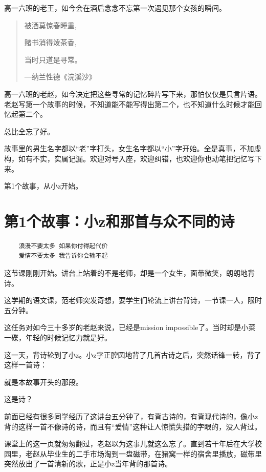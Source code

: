 \documentclass[openany]{ctexbook}
\begin{document}
高一六班的老王，如今会在酒后念念不忘第一次遇见那个女孩的瞬间。

\begin{quote}
被酒莫惊春睡重,

赌书消得泼茶香,

当时只道是寻常。

\begin{flushright}---纳兰性德《浣溪沙》\end{flushright}
\end{quote}

高一六班的老赵，如今决定把这些寻常的记忆碎片写下来，那怕仅仅是只言片语。
老赵写第一个故事的时候，不知道能不能写得出第二个，也不知道什么时候才能回忆起第二个。

总比全忘了好。

故事里的男生名字都以``老''字打头，女生名字都以``小''字开始。全是真事，不加虚构，如有不实，实属记漏。欢迎对号入座，欢迎纠错，也欢迎你也动笔把记忆写下来。

第1个故事，从小z开始。

\chapter*{第1个故事：小z和那首与众不同的诗}\label{z1}

\begin{verbatim}
    浪漫不要太多 如果你付得起代价 
    爱情不要太多 我告诉你会输不起
\end{verbatim}

这节课刚刚开始。讲台上站着的不是老师，却是一个女生，面带微笑，朗朗地背诗。

这学期的语文课，范老师突发奇想，要学生们轮流上讲台背诗，一节课一人，限时五分钟。

这任务对如今三十多岁的老赵来说，已经是mission
impossible了。当时却是小菜一碟，年轻的时候记忆力就是好。

这一天，背诗轮到了小z。小z字正腔圆地背了几首古诗之后，突然话锋一转，背了这样一首诗：

就是本故事开头的那段。

这是诗？

前面已经有很多同学经历了这讲台五分钟了，有背古诗的，有背现代诗的，像小z背的这样一首不像诗的诗，而且有``爱情''这种让人惊慌失措的字眼的，没人背过。

课堂上的这一页就匆匆翻过，老赵以为这事儿就这么忘了。直到若干年后在大学校园里，老赵从毕业生的二手市场淘到一盘磁带，在猪窝一样的宿舍里播放，磁带里突然放出了一首清新的歌，正是小z当年背的那首诗。
\end{document}
